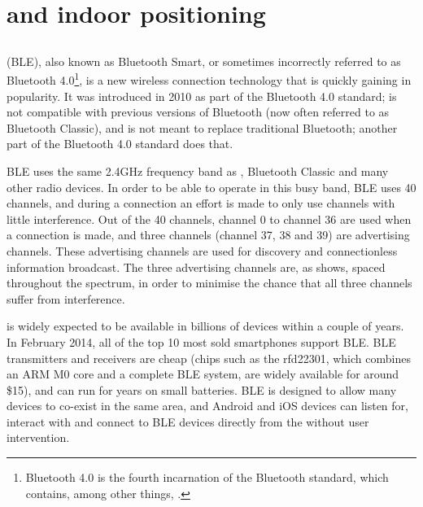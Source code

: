 \chapter{\BLE and indoor positioning}

\section{\BLE}
\BLE (BLE), also known as Bluetooth Smart, or sometimes incorrectly referred to as Bluetooth 4.0\footnote{Bluetooth 4.0 is the fourth incarnation of the Bluetooth standard, which contains, among other things, \BLE.}, is a new wireless connection technology that is quickly gaining in popularity.
It was introduced in 2010 as part of the Bluetooth 4.0 standard; is not compatible with previous versions of Bluetooth (now often referred to as Bluetooth Classic), and is not meant to replace traditional Bluetooth; another part of the Bluetooth 4.0 standard does that.


BLE uses the same 2.4GHz frequency band as \wifi, Bluetooth Classic and many other radio devices.
In order to be able to operate in this busy band, BLE uses 40 channels, and during a connection an effort is made to only use channels with little interference.
Out of the 40 channels, channel 0 to channel 36 are used when a connection is made, and three channels (channel 37, 38 and 39) are advertising channels.
These advertising channels are used for discovery and connectionless information broadcast.
The three advertising channels are, as  shows, spaced throughout the spectrum, in order to minimise the chance that all three channels suffer from interference\citep{heydon2013bluetooth}.


\BLE is widely expected to be available in billions of devices within a couple of years.
In February 2014, all of the top 10 most sold smartphones support BLE.
BLE transmitters and receivers are cheap (chips such as the rfd22301, which combines an ARM M0 core and a complete BLE system, are widely available for around \$15), and can run for years on small batteries.
BLE is designed to allow many devices to co-exist in the same area\citep{heydon2013bluetooth}, and Android and iOS devices can listen for, interact with and connect to BLE devices directly from the \app without user intervention.

